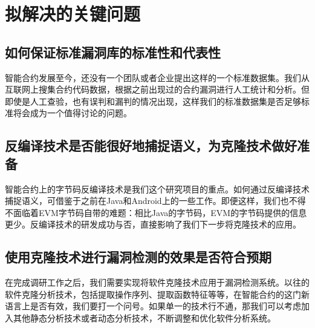 \section{拟解决的关键问题}

\subsection{如何保证标准漏洞库的标准性和代表性}

智能合约发展至今，还没有一个团队或者企业提出这样的一个标准数据集。我们从互联网上搜集合约代码数据，根据之前出现过的合约漏洞进行人工统计和分析。但即使是人工查验，也有误判和漏判的情况出现，这样我们的标准数据集是否足够标准将会成为一个值得讨论的问题。

\subsection{反编译技术是否能很好地捕捉语义，为克隆技术做好准备}

智能合约上的字节码反编译技术是我们这个研究项目的重点。如何通过反编译技术捕捉语义，可借鉴于之前在Java和Android上的一些工作。即便这样，我们也不得不面临着EVM字节码自带的难题：相比Java的字节码，EVM的字节码提供的信息更少。反编译技术的研发成功与否，直接影响了我们下一步将克隆技术的应用。

\subsection{使用克隆技术进行漏洞检测的效果是否符合预期}

在完成调研工作之后，我们需要实现将软件克隆技术应用于漏洞检测系统。以往的软件克隆分析技术，包括提取操作序列、提取函数特征等等，在智能合约的这门新语言上是否有效，我们要打一个问号。如果单一的技术行不通，那我们可以考虑加入其他静态分析技术或者动态分析技术，不断调整和优化软件分析系统。